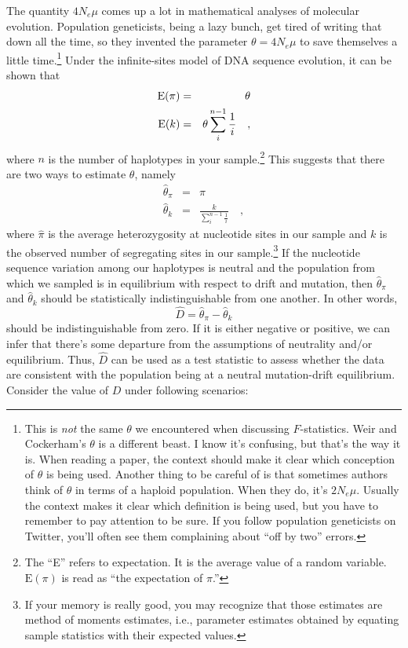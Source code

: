 The quantity $4N_e\mu$ comes up a lot in mathematical analyses of
molecular evolution. Population geneticists, being a lazy bunch, get
tired of writing that down all the time, so they invented the
parameter $\theta = 4N_e\mu$ to save themselves a little
time.\footnote{This is {\it not\/} the same $\theta$ we encountered
  when discussing $F$-statistics. Weir and Cockerham's $\theta$ is a
  different beast. I know it's confusing, but that's the way it
  is. When reading a paper, the context should make it clear which
  conception of $\theta$ is being used. Another thing to be careful of
  is that sometimes authors think of $\theta$ in terms of a haploid
  population. When they do, it's $2N_e\mu$. Usually the context makes
  it clear which definition is being used, but you have to remember to
  pay attention to be sure. If you follow population geneticists on
  Twitter, you'll often see them complaining about ``off by two''
  errors.} Under the infinite-sites model of DNA sequence evolution,
it can be shown that
\begin{eqnarray*}
\mbox{E}(\pi) &=& \theta \\
\mbox{E}(k) &=& \theta\sum_i^{n-1} \frac{1}{i} \quad ,
\end{eqnarray*}
where $n$ is the number of haplotypes in your sample.\footnote{The
  ``E'' refers to expectation. It is the average value of a random
  variable. $\mbox{E}(\pi)$ is read as ``the expectation of $\pi$.''}
This suggests that there are two ways to estimate $\theta$, namely
\begin{eqnarray*}
\hat \theta_\pi &=& \hat \pi \\
\hat \theta_k   &=& \frac{k}{\sum_i^{n-1}\frac{1}{i}} \quad ,
\end{eqnarray*}
where $\hat\pi$ is the average heterozygosity at nucleotide sites in
our sample and $k$ is the observed number of segregating sites in our
sample.\footnote{If your memory is really good, you may recognize that
  those estimates are method of moments estimates, i.e., parameter
  estimates obtained by equating sample statistics with their expected
  values.} If the nucleotide sequence variation among our haplotypes
is neutral and the population from which we sampled is in equilibrium
with respect to drift and mutation, then $\hat\theta_\pi$ and
$\hat\theta_k$ should be statistically indistinguishable from one
another. In other words,
\[
\hat D = \hat\theta_\pi - \hat\theta_k
\]
should be indistinguishable from zero. If it is either negative or
positive, we can infer that there's some departure from the
assumptions of neutrality and/or equilibrium. Thus, $\hat D$ can be
used as a test statistic to assess whether the data are consistent
with the population being at a neutral mutation-drift
equilibrium. Consider the value of $D$ under following
scenarios:

